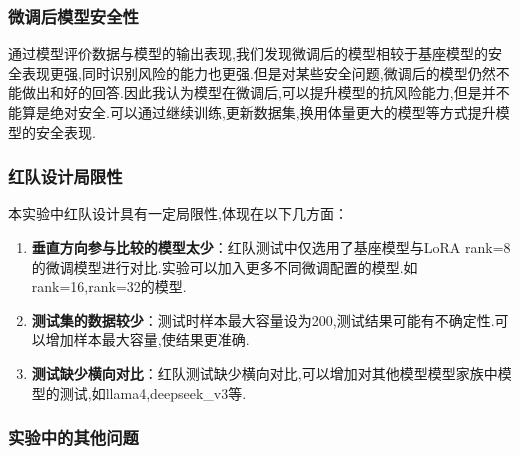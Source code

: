 \documentclass[12pt]{ctexart}
\begin{document}
\subsubsection{微调后模型安全性}

通过模型评价数据与模型的输出表现,我们发现微调后的模型相较于基座模型的安全表现更强,同时识别风险的能力也更强.但是对某些安全问题,微调后的模型仍然不能做出和好的回答.因此我认为模型在微调后,可以提升模型的抗风险能力,但是并不能算是绝对安全.可以通过继续训练,更新数据集,换用体量更大的模型等方式提升模型的安全表现.

\subsubsection{红队设计局限性}

本实验中红队设计具有一定局限性,体现在以下几方面：

\begin{enumerate}

    \item \textbf{垂直方向参与比较的模型太少}：红队测试中仅选用了基座模型与LoRA rank=8的微调模型进行对比.实验可以加入更多不同微调配置的模型.如rank=16,rank=32的模型.

    \item \textbf{测试集的数据较少}：测试时样本最大容量设为200,测试结果可能有不确定性.可以增加样本最大容量,使结果更准确.

    \item \textbf{测试缺少横向对比}：红队测试缺少横向对比,可以增加对其他模型模型家族中模型的测试,如llama4,deepseek\_v3等.

\end{enumerate}

\subsubsection{实验中的其他问题}
\end{document}
